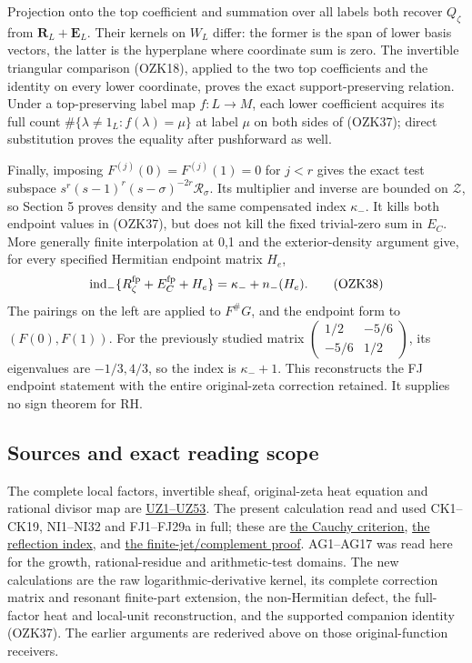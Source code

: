 \documentclass[
  10pt,
  a4paper,
]{article}
\begin{document}
Projection onto the top coefficient and summation over all labels both
recover \(Q_\zeta\) from \(\boldsymbol R_L+\boldsymbol E_L\). Their
kernels on \(W_L\) differ: the former is the span of lower basis
vectors, the latter is the hyperplane where coordinate sum is zero. The
invertible triangular comparison (OZK18), applied to the two top
coefficients and the identity on every lower coordinate, proves the
exact support-preserving relation. Under a top-preserving label map
\(f:L\to M\), each lower coefficient acquires its full count
\(\#\{\lambda\ne1_L:f(\lambda)=\mu\}\) at label \(\mu\) on both sides of
(OZK37); direct substitution proves the equality after pushforward as
well.

Finally, imposing \(F^{(j)}(0)=F^{(j)}(1)=0\) for \(j<r\) gives the
exact test subspace \(s^r(s-1)^r(s-\sigma)^{-2r}\mathcal R_\sigma\). Its
multiplier and inverse are bounded on \(\mathcal Z\), so Section 5
proves density and the same compensated index \(\kappa_-\). It kills
both endpoint values in (OZK37), but does not kill the fixed
trivial-zero sum in \(E_C\). More generally finite interpolation at 0,1
and the exterior-density argument give, for every specified Hermitian
endpoint matrix \(H_e\), \[
\operatorname{ind}_-\{R_\zeta^{\rm fp}+E_C^{\rm fp}+H_e\}
=\kappa_-+n_-(H_e).
\tag{OZK38}
\] The pairings on the left are applied to \(F^\#G\), and the endpoint
form to \((F(0),F(1))\). For the previously studied matrix
\(\left(\begin{smallmatrix}1/2&-5/6\\-5/6&1/2\end{smallmatrix}\right)\),
its eigenvalues are \(-1/3,4/3\), so the index is \(\kappa_-+1\). This
reconstructs the FJ endpoint statement with the entire original-zeta
correction retained. It supplies no sign theorem for RH.

\subsection{Sources and exact reading
scope}\label{sources-and-exact-reading-scope}

The complete local factors, invertible sheaf, original-zeta heat
equation and rational divisor map are
\href{FAITHFUL_UNCOMPLETED_ZETA_HEAT.md}{UZ1--UZ53}. The present
calculation read and used CK1--CK19, NI1--NI32 and FJ1--FJ29a in full;
these are \href{CAUCHY_WEIL_POSITIVITY_CRITERION.md}{the Cauchy
criterion}, \href{CAUCHY_REFLECTION_INDEX_DERIVATION.md}{the reflection
index}, and \href{FINITE_JET_COMPLEMENT_AND_HEAT_TRUNCATION.md}{the
finite-jet/complement proof}. AG1--AG17 was read here for the growth,
rational-residue and arithmetic-test domains. The new calculations are
the raw logarithmic-derivative kernel, its complete correction matrix
and resonant finite-part extension, the non-Hermitian defect, the
full-factor heat and local-unit reconstruction, and the supported
companion identity (OZK37). The earlier arguments are rederived above on
those original-function receivers.
\end{document}
